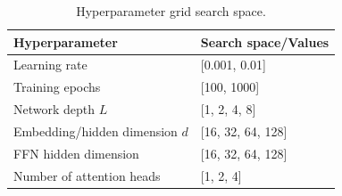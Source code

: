 \begin{table}
\TableStyle
\caption{Hyperparameter grid search space.}
\label{tab:4-1}
\begin{tabularx}{\linewidth}{@{\extracolsep{\fill}}L{0.90}L{1.10}@{}}
\toprule
Hyperparameter & Search space/Values \\
\midrule
Learning rate & [0.001, 0.01] \\
Training epochs & [100, 1000] \\
Network depth $L$ & [1, 2, 4, 8] \\
Embedding/hidden dimension $d$ & [16, 32, 64, 128] \\
FFN hidden dimension & [16, 32, 64, 128] \\
Number of attention heads & [1, 2, 4] \\
\bottomrule
\end{tabularx}
\end{table}
